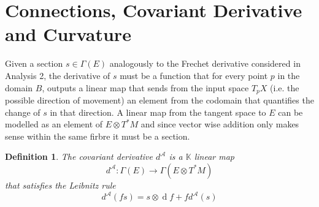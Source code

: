 \documentclass{article}
\numberwithin{theorem}{section}
\newtheorem{definition}[theorem]{Definition}
\renewcommand{\d}[1]{\ensuremath{\operatorname{d}\!{#1}}}
\newcommand{\1}{\mathds{1}}
\begin{document}
\section{Connections, Covariant Derivative and Curvature}

Given a section $s \in \Gamma(E)$ analogously to the Frechet derivative 
considered in Analysis 2, the derivative of $s$ must be a function that 
for every point $p$ in the domain $B$, outputs a linear map that sends from the input space 
$T_pX$ (i.e. the possible direction of movement) an element from the codomain 
that quantifies the change of $s$ in that direction. A linear map from 
the tangent space to $E$ can be modelled as an element of $E\otimes T^*M$ 
and since vector wise addition only makes sense within the same firbre it must 
be a section. 
\begin{definition}
    The covariant derivative $d^{\mathcal{A}}$ is a $\mathbb{K}$ linear map
    \[ d^{\mathcal{A}} : \Gamma(E) \to \Gamma(E \otimes T^{*}M)\]
    that satisfies the Leibnitz rule 
    \[ d^{\mathcal{A}}(fs) = s \otimes \d f + f d^{\mathcal{A}}(s)  \]
\end{definition}
\end{document}
